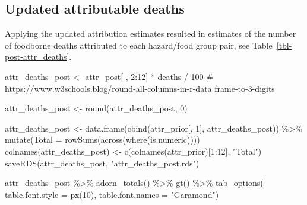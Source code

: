 \documentclass[
  letterpaper,
  DIV=11,
  numbers=noendperiod]{scrartcl}
\newenvironment{Shaded}{\begin{snugshade}}{\end{snugshade}}
\newcommand{\AttributeTok}[1]{\textcolor[rgb]{0.40,0.45,0.13}{#1}}
\newcommand{\CommentTok}[1]{\textcolor[rgb]{0.37,0.37,0.37}{#1}}
\newcommand{\DecValTok}[1]{\textcolor[rgb]{0.68,0.00,0.00}{#1}}
\newcommand{\FunctionTok}[1]{\textcolor[rgb]{0.28,0.35,0.67}{#1}}
\newcommand{\NormalTok}[1]{\textcolor[rgb]{0.00,0.23,0.31}{#1}}
\newcommand{\OtherTok}[1]{\textcolor[rgb]{0.00,0.23,0.31}{#1}}
\newcommand{\SpecialCharTok}[1]{\textcolor[rgb]{0.37,0.37,0.37}{#1}}
\newcommand{\StringTok}[1]{\textcolor[rgb]{0.13,0.47,0.30}{#1}}
\begin{document}
\subsection{Updated attributable
deaths}\label{updated-attributable-deaths}

Applying the updated attribution estimates resulted in estimates of the
number of foodborne deaths attributed to each hazard/food group pair,
see Table~\ref{tbl-post-attr_deaths}.

\begin{Shaded}
\begin{Highlighting}[]
\NormalTok{attr\_deaths\_post }\OtherTok{\textless{}{-}}\NormalTok{ attr\_post[ , }\DecValTok{2}\SpecialCharTok{:}\DecValTok{12}\NormalTok{] }\SpecialCharTok{*}\NormalTok{ deaths }\SpecialCharTok{/} \DecValTok{100}
\CommentTok{\# https://www.w3schools.blog/round{-}all{-}columns{-}in{-}r{-}data frame{-}to{-}3{-}digits}

\NormalTok{attr\_deaths\_post }\OtherTok{\textless{}{-}} \FunctionTok{round}\NormalTok{(attr\_deaths\_post, }\DecValTok{0}\NormalTok{)}

\NormalTok{attr\_deaths\_post }\OtherTok{\textless{}{-}} \FunctionTok{data.frame}\NormalTok{(}\FunctionTok{cbind}\NormalTok{(attr\_prior[, }\DecValTok{1}\NormalTok{], attr\_deaths\_post)) }\SpecialCharTok{\%\textgreater{}\%} \FunctionTok{mutate}\NormalTok{(}\AttributeTok{Total =} \FunctionTok{rowSums}\NormalTok{(}\FunctionTok{across}\NormalTok{(}\FunctionTok{where}\NormalTok{(is.numeric))))}
\FunctionTok{colnames}\NormalTok{(attr\_deaths\_post) }\OtherTok{\textless{}{-}} \FunctionTok{c}\NormalTok{(}\FunctionTok{colnames}\NormalTok{(attr\_prior)[}\DecValTok{1}\SpecialCharTok{:}\DecValTok{12}\NormalTok{], }\StringTok{"Total"}\NormalTok{)}
\FunctionTok{saveRDS}\NormalTok{(attr\_deaths\_post, }\StringTok{"attr\_deaths\_post.rds"}\NormalTok{)}
\end{Highlighting}
\end{Shaded}

\begin{Shaded}
\begin{Highlighting}[]
\NormalTok{attr\_deaths\_post }\SpecialCharTok{\%\textgreater{}\%} 
  \FunctionTok{adorn\_totals}\NormalTok{() }\SpecialCharTok{\%\textgreater{}\%}
  \FunctionTok{gt}\NormalTok{() }\SpecialCharTok{\%\textgreater{}\%} 
    \FunctionTok{tab\_options}\NormalTok{(}
      \AttributeTok{table.font.style =} \FunctionTok{px}\NormalTok{(}\DecValTok{10}\NormalTok{),}
      \AttributeTok{table.font.names =} \StringTok{"Garamond"}\NormalTok{)}
\end{Highlighting}
\end{Shaded}
\end{document}
